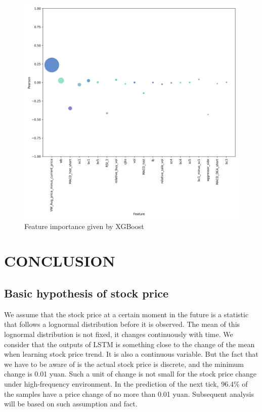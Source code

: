 \documentclass[10pt, conference, compsocconf]{IEEEtran}
\begin{document}
\begin{figure}[ht]
	\centering
	\includegraphics[scale=0.07]{fi_xgboost_npd.png}
	\caption{Feature importance given by XGBoost} \label{fig 11}
\end{figure}

\section{CONCLUSION}
\subsection{Basic hypothesis of stock price}
We assume that the stock price at a certain moment in the future is a statistic that follows a lognormal distribution before it is observed. 
The mean of this lognormal distribution is not fixed, it changes continuously with time. We consider that the outputs of LSTM is something 
close to the change of the mean when learning stock price trend. It is also a continuous variable. But the fact that we have to be aware of 
is the actual stock price is discrete, and the minimum change is 0.01 yuan. Such a unit of change is not small for the stock price change 
under high-frequency environment. In the prediction of the next tick, 96.4\% of the samples have a price change of no more than 0.01 yuan. 
Subsequent analysis will be based on such assumption and fact.
\end{document}
